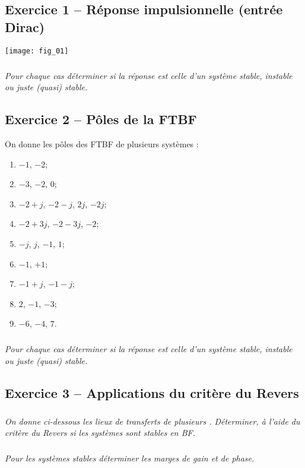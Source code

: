 \ifprof
\else
\begin{multicols}{2}
\fi

\subsection*{Exercice 1 -- Réponse impulsionnelle (entrée Dirac)}
\setcounter{exo}{0}
\ifprof
\else
\begin{center}
\texttt{[image: fig\_01]}
\end{center}
\fi
\subparagraph*{}\textit{Pour chaque cas déterminer si la réponse est celle d'un système stable, instable ou juste (quasi) stable.}

\subsection*{Exercice 2 -- Pôles de la FTBF}
\setcounter{exo}{0}
\ifprof
\else
On donne les pôles des FTBF de plusieurs systèmes :
\begin{multicols}{2}
\begin{enumerate}
\item $-1$, $-2$;
\item $-3$, $-2$, $0$;
\item $-2+j$, $-2-j$, $2j$, $-2j$;
\item $-2+3j$, $-2-3j$, $-2$;
\item $-j$, $j$, $-1$, $1$;
\item $-1$, $+1$;
\item $-1+j$, $-1-j$;
\item $2$, $-1$, $-3$;
\item $-6$, $-4$, $7$.
\end{enumerate}
\end{multicols}
\fi
\subparagraph*{}\textit{Pour chaque cas déterminer si la réponse est celle d'un système stable, instable ou juste  (quasi) stable.}





\subsection*{Exercice 3 -- Applications du critère du Revers}
\setcounter{exo}{0}
\subparagraph*{}\textit{On donne ci-dessous les lieux de transferts de plusieurs {}. Déterminer, à l'aide du critère du Revers si les systèmes sont stables en BF.}
\subparagraph*{}\textit{Pour les systèmes stables déterminer les marges de gain et de phase.}


\end{multicols}
